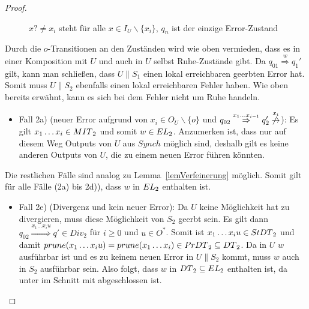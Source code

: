 \begin{proof}
\begin{itemize}
\begin{figure} [h!tbp]
\begin{center}
        \caption{$x?\neq x_i$ steht für alle $x\in I_U\backslash\{x_i\}$, $q_n$
          ist der einzige Error-Zustand}
\label{UmitEundO}
      \end{center}
      \end{figure}
      Durch die $o$-Transitionen an den Zuständen wird wie oben vermieden, dass
      es in einer Komposition mit $U$ und auch in $U$ selbst Ruhe-Zustände
      gibt. Da $q_{01} \overset{w}{\Rightarrow} q_1'$ gilt, kann man schließen,
      dass $U\|S_1$ einen lokal erreichbaren geerbten Error hat. Somit muss
      $U\|S_2$ ebenfalls einen lokal erreichbaren Fehler haben. Wie oben
      bereits erwähnt, kann es sich bei dem Fehler nicht um Ruhe handeln.
      \begin{itemize}
        \item Fall 2a) (neuer Error aufgrund von $x_i\in O_U\backslash\{o\}$
          und $q_{02} \overset{x_1\dots x_{i-1}}{\Rightarrow} q_2'
          \overset{x_i}{\not{\hspace{-0.1cm}\rightarrow}}$): Es gilt $x_1\dots
          x_i\in MIT{}_2$ und somit $w\in EL{}_2$. Anzumerken ist, dass nur
          auf diesem Weg Outputs von $U$ aus $Synch$ möglich sind, deshalb gilt
          es keine anderen Outputs von $U$, die zu einem neuen Error führen
          könnten.
      \end{itemize}
      Die restlichen Fälle sind analog zu Lemma~\ref{lemVerfeinerung} möglich.
      Somit gilt für alle Fälle (2a) bis 2d)), dass $w$ in $EL{}_2$ enthalten
      ist.
      \begin{itemize}
        \item Fall 2e) (Divergenz und kein neuer Error): Da $U$ keine
          Möglichkeit hat zu divergieren, muss diese Möglichkeit von $S_2$
          geerbt sein. Es gilt dann $q_{02} \overset{x_1\dots
          x_iu}{\Rightarrow} q'\in Div_2$ für $i\geq 0$ und $u\in O^*$. Somit
          ist $x_1\dots x_iu\in StDT{}_2$ und damit $prune{}(x_1\dots x_iu)=
          prune{}(x_1\dots x_i)\in PrDT{}_2\subseteq DT{}_2$. Da in $U$ $w$
          ausführbar ist und es zu keinem neuen Error in $U\|S_2$ kommt, muss
          $w$ auch in $S_2$ ausführbar sein. Also folgt, dass $w$ in $DT{}_2
          \subseteq EL{}_2$ enthalten ist, da \DT{} unter \cont{} im Schnitt
          mit \EL{} abgeschlossen ist.
      \end{itemize}
  \end{itemize}


\end{proof}
